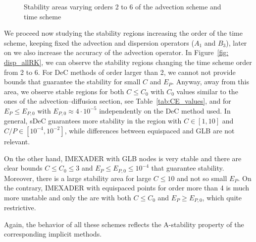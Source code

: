 \begin{figure}
	\caption{Stability areas varying orders 2 to 6 of the advection scheme and time scheme}
	\label{fig: disp_alladv_GLB}
\end{figure}
We proceed now studying the stability regions increasing the order of the time scheme, keeping fixed the advection and dispersion operators ($A_1$ and $B_3$), later on we also increase the accuracy of the advection operator.
In Figure~\ref{fig: disp_allRK}, we can observe the stability regions changing the time scheme order from 2 to 6. 
For DeC methods of order larger than 2, we cannot  not provide bounds that guarantee the stability for small $C$ and $E_P$.
Anyway, away from this area, we observe stable regions for both $C\leq C_0$ with $C_0$ values similar to the ones of the advection--diffusion section, see Table~\ref{tab:CE_values}, and for $E_P\leq E_{P,0}$ with $E_{P,0}\approx 4\cdot 10^{-5}$ independently on the DeC method used.
In general, sDeC guarantees more stability in the region with $C\in [1,10]$ and $C/P\in [10^{-4},10^{-2}]$, while differences between equispaced and GLB are not relevant.

On the other hand, IMEXADER with GLB nodes is very stable and there are clear bounds $C\leq C_0\leq 3$ and $E_P\leq E_{P,0}\leq 10^{-4}$ that guarantee stability. Moreover, there is a large stability area for large $C\leq 10$ and not so small $E_P$.
On the contrary, IMEXADER with equispaced points for order more than 4 is much more unstable and only the are with both $C\leq C_0$ and $E_P \geq E_{P,0}$, which quite restrictive.

Again, the behavior of all these schemes reflects the A-stability property of the corresponding implicit methods.

